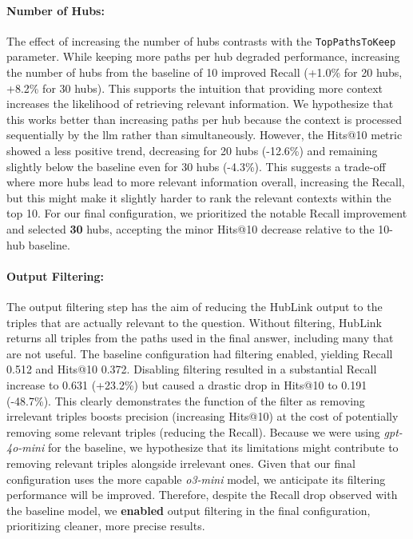 \begin{sloppypar}
\paragraph{Number of Hubs:} 
The effect of increasing the number of hubs contrasts with the \texttt{TopPathsToKeep} parameter. While keeping more paths per hub degraded performance, increasing the number of hubs from the baseline of 10 improved Recall (+1.0\% for 20 hubs, +8.2\% for 30 hubs). This supports the intuition that providing more context increases the likelihood of retrieving relevant information. We hypothesize that this works better than increasing paths per hub because the context is processed sequentially by the \gls{llm} rather than simultaneously. However, the Hits@10 metric showed a less positive trend, decreasing for 20 hubs (-12.6\%) and remaining slightly below the baseline even for 30 hubs (-4.3\%). This suggests a trade-off where more hubs lead to more relevant information overall, increasing the Recall, but this might make it slightly harder to rank the relevant contexts within the top 10. For our final configuration, we prioritized the notable Recall improvement and selected \textbf{30} hubs, accepting the minor Hits@10 decrease relative to the 10-hub baseline.
\end{sloppypar}

\paragraph{Output Filtering:} 
The output filtering step has the aim of reducing the HubLink output to the triples that are actually relevant to the question. Without filtering, HubLink returns all triples from the paths used in the final answer, including many that are not useful. The baseline configuration had filtering enabled, yielding Recall 0.512 and Hits@10 0.372. Disabling filtering resulted in a substantial Recall increase to 0.631 (+23.2\%) but caused a drastic drop in Hits@10 to 0.191 (-48.7\%). This clearly demonstrates the function of the filter as removing irrelevant triples boosts precision (increasing Hits@10) at the cost of potentially removing some relevant triples (reducing the Recall). Because we were using \emph{gpt-4o-mini} for the baseline, we hypothesize that its limitations might contribute to removing relevant triples alongside irrelevant ones. Given that our final configuration uses the more capable \emph{o3-mini} model, we anticipate its filtering performance will be improved. Therefore, despite the Recall drop observed with the baseline model, we \textbf{enabled} output filtering in the final configuration, prioritizing cleaner, more precise results.

